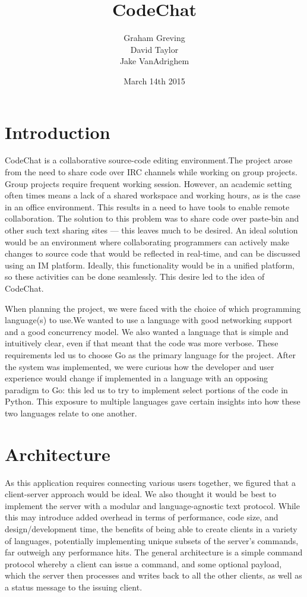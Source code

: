\documentclass[10pt, letterpaper]{article}
\title{CodeChat}
\author{Graham Greving \\ David Taylor \\ Jake VanAdrighem}
\date{March 14th 2015}
\begin{document}
\maketitle

\section*{Introduction}


CodeChat is a collaborative source-code editing environment.The project 
arose from the need to share code over IRC channels while working on 
group projects. Group projects require frequent working session. 
However, an academic setting often times means a lack of a shared 
workspace and working hours, as is the case in an office environment. 
This results in a need to have tools to enable remote collaboration. 
The solution to this problem was to share code over paste-bin and other 
such text sharing sites --- this leaves much to be desired. An ideal 
solution would be an environment where collaborating programmers can 
actively make changes to source code that would be reflected in 
real-time, and can be discussed using an IM platform. Ideally, this 
functionality would be in a unified platform, so these activities can 
be done seamlessly. This desire led to the idea of CodeChat.


When planning the project, we were faced with the choice of which 
programming language(s) to use.We wanted to use a language with good 
networking support and a good concurrency model. We also wanted a 
language that is simple and intuitively clear, even if that meant that 
the code was more verbose. These requirements led us to choose Go as 
the primary language for the project. After the system was implemented, 
we were curious how the developer and user experience would change if 
implemented in a language with an opposing paradigm to Go: this led us 
to try to implement select portions of the code in Python. This 
exposure to multiple languages gave certain insights into how these two 
languages relate to one another.

\section*{Architecture}

As this application requires connecting various users together, we 
figured that a client-server approach would be ideal. We also thought 
it would be best to implement the server with a modular and 
language-agnostic text protocol. While this may introduce added 
overhead in terms of performance, code size, and design/development 
time, the benefits of being able to create clients in a variety of 
languages, potentially implementing unique subsets of the server's 
commands, far outweigh any performance hits. The general architecture 
is a simple command protocol whereby a client can issue a command, and 
some optional payload, which the server then processes and writes back 
to all the other clients, as well as a status message to the issuing 
client.
\end{document}
